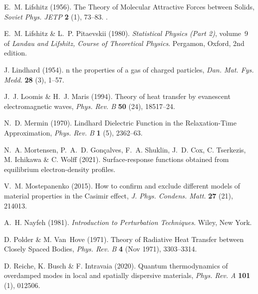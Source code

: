 \documentclass[11pt, oneside]{article}   	%
\begin{document}
\begin{thebibliography}{58}
E.~M. Lifshitz (1956).
\newblock The Theory of Molecular Attractive Forces between Solids,
  \emph{Soviet Phys. JETP} {\bf 2} (1), 73--83.
.

E.~M. Lifshitz \& L.~P. Pitaevskii (1980).
\newblock \emph{Statistical Physics (Part 2)}, volume~9 of \emph{Landau and
  Lifshitz, Course of Theoretical Physics}.
\newblock Pergamon, Oxford, 2nd edition.

J. Lindhard (1954).
n the properties of a gas of charged particles, \emph{Dan. Mat.
  Fys. Medd.} {\bf 28} (3), 1--57.

J.~J. Loomis \& H.~J. Maris (1994).
\newblock Theory of heat transfer by evanescent electromagnetic waves,
  \emph{Phys. Rev. B} {\bf 50} (24), 18517--24.

N.~D. Mermin (1970).
\newblock Lindhard Dielectric Function in the Relaxation-Time Approximation,
  \emph{Phys. Rev. B} {\bf 1} (5), 2362--63.

N.~A. Mortensen, P.~A.~D. Gon{\c c}alves, F.~A. Shuklin, J.~D. Cox, C.
  Tserkezis, M. Ichikawa \& C. Wolff (2021).
\newblock Surface-response functions obtained from equilibrium electron-density
  profiles.

V.~M. Mostepanenko (2015).
\newblock How to confirm and exclude different models of material properties in
  the Casimir effect, \emph{J. Phys. Condens. Matt.} {\bf 27} (21), 214013.

A.~H. Nayfeh (1981).
\newblock \emph{Introduction to Perturbation Techniques}.
\newblock Wiley, New York.

D. Polder \& M. Van~Hove (1971).
\newblock Theory of Radiative Heat Transfer between Closely Spaced Bodies,
  \emph{Phys. Rev. B} {\bf 4} (Nov 1971), 3303--3314.

D. Reiche, K. Busch \& F. Intravaia (2020).
\newblock Quantum thermodynamics of overdamped modes in local and spatially
  dispersive materials, \emph{Phys. Rev. A} {\bf 101} (1), 012506.


\end{thebibliography}
\end{document}
